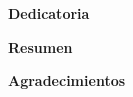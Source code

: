 


  \cleardoublepage {}
  \begin{center} \Large \textbf{Dedicatoria} \end{center}



  \cleardoublepage
   
  \begin{center} \Large \textbf{Resumen} \end{center}
  \resumen




  \cleardoublepage {}
  \begin{center} \Large \textbf{Agradecimientos}
  
  \end{center}



  \cleardoublepage
  \tableofcontents
  \cleardoublepage
  \listoffigures
  \cleardoublepage
  \listoftables
  \cleardoublepage

  \normalsize

